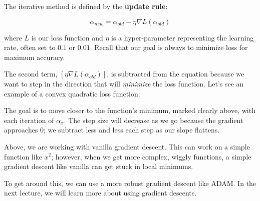 The iterative method is defined by the \textbf{update rule}:

\begin{equation}
    \alpha_{new} = \alpha_{old} - \eta \nabla L (\alpha_{old})
\end{equation}

where $L$ is our loss function and $\eta$ is a hyper-parameter representing the learning rate, often set to $0.1$ or $0.01$. Recall that our goal is always to minimize loss for maximum accuracy. 

The second term, $[\eta \nabla L (\alpha_{old})]$, is subtracted from the equation because we want to step in the direction that will \textit{minimize} the loss function. Let's see an example of a convex quadratic loss function:

\begin{center}
\end{center}

The goal is to move closer to the function's minimum, marked clearly above, with each iteration of $\alpha_x$. The step size will decrease as we go because the gradient approaches $0$; we subtract less and less each step as our slope flattens. 

Above, we are working with vanilla gradient descent. This can work on a simple function like $x^2$; however, when we get more complex, wiggly functions, a simple gradient descent like vanilla can get stuck in local minimums.

To get around this, we can use a more robust gradient descent like ADAM. In the next lecture, we will learn more about using gradient descents. 
